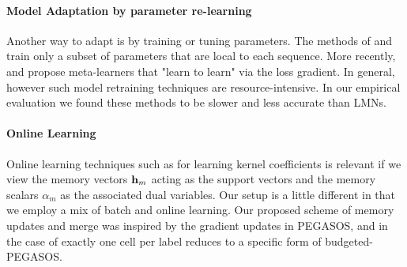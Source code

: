 \documentclass[letterpaper]{article} %
\newcommand{\vek}[1]{{\bf {#1}}}
\newcommand{\vh}{{\vek{h}}}
\begin{document}
\paragraph{Model Adaptation by parameter re-learning}
Another way to adapt is by training or tuning parameters. The methods of \cite{Rei15} and \cite{Huang2015MaximumAP} train only a subset of parameters that are local to each sequence.  More recently,\cite{Finn2017ModelAgnosticMF} and \cite{ravi17} propose meta-learners that "learn to learn" via 
the loss gradient. In general, however such model retraining techniques are resource-intensive. In our empirical evaluation we found these methods to be slower and less accurate than LMNs. 

\paragraph{Online Learning} Online learning techniques such as \cite{shalevshwartz:icml07} for learning kernel coefficients is relevant if we view the memory vectors $ \vh_m$ acting as the support vectors and the memory scalars $\alpha_m$ as the associated dual variables.  Our setup is a little different in that we employ a mix of batch and online learning. Our proposed scheme of memory updates and merge was inspired by the gradient updates in PEGASOS, and in the case of exactly one cell per label reduces to a specific form of budgeted-PEGASOS\cite{WangCV10}.


\end{document}
